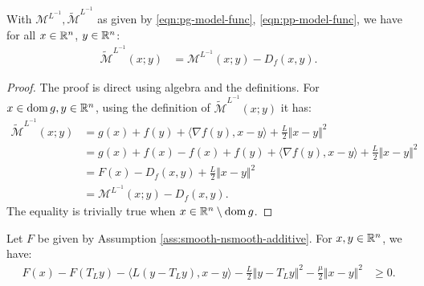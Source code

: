 \documentclass[12pt]{article}
\begin{document}
    \begin{lemma}\label{lemma:pg-envelope}
        With $\mathcal M^{L^{-1}}, \widetilde{\mathcal M}^{L^{-1}}$ as given by \eqref{eqn:pg-model-func}, \eqref{eqn:pp-model-func},
        we have for all $x \in \mathbb R^n$, $y \in \mathbb R^n$:
        \begin{align*}
            \widetilde{\mathcal M}^{L^{-1}}(x; y)
            &=
            \mathcal M^{L^{-1}}(x; y)- D_f(x, y).
        \end{align*}
    \end{lemma}
    \begin{proof}
        The proof is direct using algebra and the definitions.
        For $x \in \operatorname{dom} g, y \in \mathbb R^n$, using the definition of $\widetilde{\mathcal M}^{L^{-1}}(x; y)$ it has:
        \begin{align*}
            \widetilde{\mathcal M}^{L^{-1}}(x; y)
            &=
            g(x) + f(y) + \langle \nabla f(y), x - y\rangle + \frac{L}{2}\Vert x - y\Vert^2
            \\
            &=
            g(x) + f(x) - f(x) + f(y)
            + \langle \nabla f(y), x - y\rangle + \frac{L}{2}\Vert x - y\Vert^2
            \\
            &=
            F(x) - D_f(x, y) + \frac{L}{2}\Vert x - y\Vert^2
            \\
            &= \mathcal M^{L^{-1}}(x; y) - D_f(x, y).
        \end{align*}
        The equality is trivially true when $x \in \mathbb R^n \setminus \operatorname{dom} g$.
    \end{proof}
    \begin{theorem}\label{thm:prox-grad-ineq}
        Let $F$ be given by Assumption \ref{ass:smooth-nsmooth-additive}.
        For $x,y\in \mathbb R^n$, we have:
        \begin{align*}
            F(x) - F(T_Ly) - \langle L(y - T_Ly), x - y\rangle
            - \frac{L}{2}\Vert y - T_L y\Vert^2
            - \frac{\mu}{2}\Vert x - y\Vert^2
            &\ge
            0.
        \end{align*}
    \end{theorem}
\end{document}
